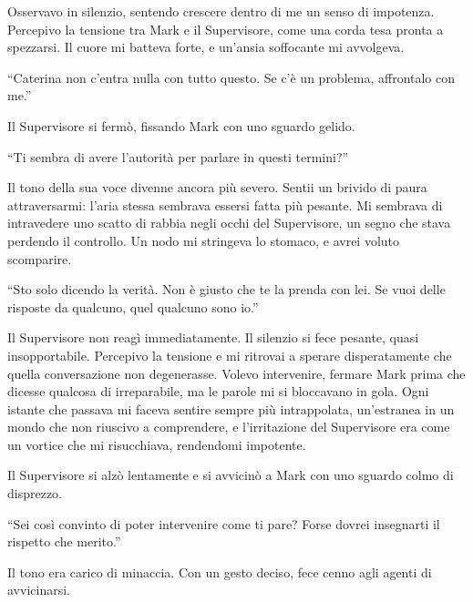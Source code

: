 Osservavo in silenzio, sentendo crescere dentro di me un senso di impotenza. Percepivo la tensione tra Mark e il Supervisore, come una corda tesa pronta a spezzarsi. Il cuore mi batteva forte, e un'ansia soffocante mi avvolgeva.

\begin{dialogue}
 \enquote{Caterina non c'entra nulla con tutto questo. Se c'è un problema, affrontalo con me.}
\end{dialogue}

Il Supervisore si fermò, fissando Mark con uno sguardo gelido.

\begin{dialogue}
 \enquote{Ti sembra di avere l'autorità per parlare in questi termini?}
\end{dialogue}

Il tono della sua voce divenne ancora più severo. Sentii un brivido di paura attraversarmi: l'aria stessa sembrava essersi fatta più pesante. Mi sembrava di intravedere uno scatto di rabbia negli occhi del Supervisore, un segno che stava perdendo il controllo. Un nodo mi stringeva lo stomaco, e avrei voluto scomparire.

\begin{dialogue}
 \enquote{Sto solo dicendo la verità. Non è giusto che te la prenda con lei. Se vuoi delle risposte da qualcuno, quel qualcuno sono io.}
\end{dialogue}

Il Supervisore non reagì immediatamente. Il silenzio si fece pesante, quasi insopportabile. Percepivo la tensione e  mi ritrovai a sperare disperatamente che quella conversazione non degenerasse. Volevo intervenire, fermare Mark prima che dicesse qualcosa di irreparabile, ma le parole mi si bloccavano in gola. Ogni istante che passava mi faceva sentire sempre più intrappolata, un'estranea in un mondo che non riuscivo a comprendere, e l'irritazione del Supervisore era come un vortice che mi risucchiava, rendendomi impotente.

Il Supervisore si alzò lentamente e si avvicinò a Mark con uno sguardo colmo di disprezzo.

\begin{dialogue}
 \enquote{Sei così convinto di poter intervenire come ti pare? Forse dovrei insegnarti il rispetto che merito.}
\end{dialogue}

Il tono era carico di minaccia. Con un gesto deciso, fece cenno agli agenti di avvicinarsi.

